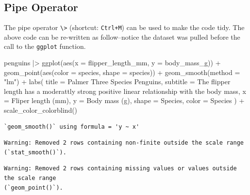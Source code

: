 \documentclass[
  letterpaper,
  DIV=11,
  numbers=noendperiod]{scrreprt}
\newenvironment{Shaded}{\begin{snugshade}}{\end{snugshade}}
\newcommand{\AttributeTok}[1]{\textcolor[rgb]{0.40,0.45,0.13}{#1}}
\newcommand{\FunctionTok}[1]{\textcolor[rgb]{0.28,0.35,0.67}{#1}}
\newcommand{\NormalTok}[1]{\textcolor[rgb]{0.00,0.23,0.31}{#1}}
\newcommand{\SpecialCharTok}[1]{\textcolor[rgb]{0.37,0.37,0.37}{#1}}
\newcommand{\StringTok}[1]{\textcolor[rgb]{0.13,0.47,0.30}{#1}}
\begin{document}
\subsection{Pipe Operator}\label{pipe-operator}

The pipe operator \texttt{\textbackslash{}\textgreater{}} (shortcut:
\texttt{Ctrl+M}) can be used to make the code tidy. The above code can
be re-written as follow--notice the dataset was pulled before the call
to the \texttt{ggplot} function.

\begin{Shaded}
\begin{Highlighting}[]
\NormalTok{penguins }\SpecialCharTok{|\textgreater{}}
  \FunctionTok{ggplot}\NormalTok{(}\FunctionTok{aes}\NormalTok{(}\AttributeTok{x =}\NormalTok{ flipper\_length\_mm, }\AttributeTok{y =}\NormalTok{ body\_mass\_g)) }\SpecialCharTok{+}
  \FunctionTok{geom\_point}\NormalTok{(}\FunctionTok{aes}\NormalTok{(}\AttributeTok{color =}\NormalTok{ species, }\AttributeTok{shape =}\NormalTok{ species)) }\SpecialCharTok{+}
  \FunctionTok{geom\_smooth}\NormalTok{(}\AttributeTok{method =} \StringTok{"lm"}\NormalTok{) }\SpecialCharTok{+}
  \FunctionTok{labs}\NormalTok{(}
    \AttributeTok{title =} \StringTok{\textquotesingle{}Palmer Three Species Penguins\textquotesingle{}}\NormalTok{,}
    \AttributeTok{subtitle =} \StringTok{\textquotesingle{}The flipper length has a moderattly strong positive linear relationship with the body mass\textquotesingle{}}\NormalTok{,}
    \AttributeTok{x =} \StringTok{\textquotesingle{}Fliper length (mm)\textquotesingle{}}\NormalTok{,}
    \AttributeTok{y =} \StringTok{\textquotesingle{}Body mass (g)\textquotesingle{}}\NormalTok{,}
    \AttributeTok{shape =} \StringTok{\textquotesingle{}Species\textquotesingle{}}\NormalTok{,}
    \AttributeTok{color =} \StringTok{\textquotesingle{}Species\textquotesingle{}}
\NormalTok{  ) }\SpecialCharTok{+}
  \FunctionTok{scale\_color\_colorblind}\NormalTok{()}
\end{Highlighting}
\end{Shaded}

\begin{verbatim}
`geom_smooth()` using formula = 'y ~ x'
\end{verbatim}

\begin{verbatim}
Warning: Removed 2 rows containing non-finite outside the scale range
(`stat_smooth()`).
\end{verbatim}

\begin{verbatim}
Warning: Removed 2 rows containing missing values or values outside the scale range
(`geom_point()`).
\end{verbatim}
\end{document}
